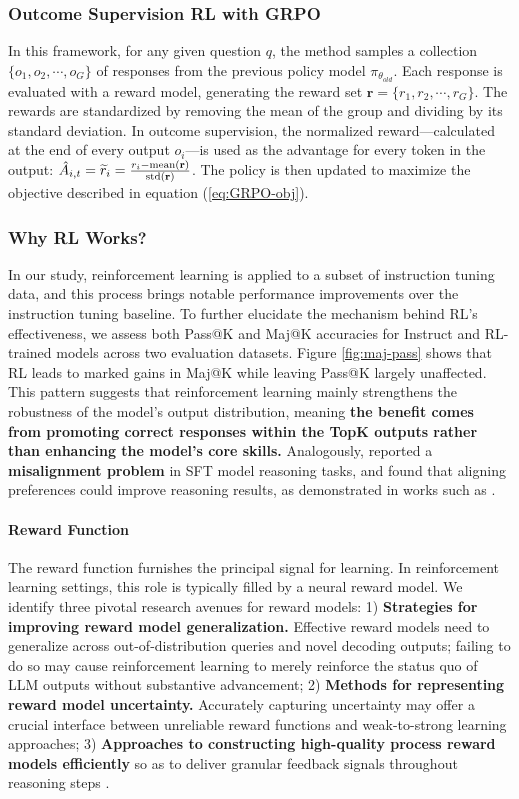 \subsubsection{Outcome Supervision RL with GRPO} In this framework, for any given question $q$, the method samples a collection $\{o_1, o_2, \cdots, o_G\}$ of responses from the previous policy model $\pi_{\theta_{old}}$. Each response is evaluated with a reward model, generating the reward set $\mathbf{r}=\{r_1, r_2, \cdots, r_G\}$. The rewards are standardized by removing the mean of the group and dividing by its standard deviation. In outcome supervision, the normalized reward—calculated at the end of every output $o_i$—is used as the advantage for every token in the output: $\hat{A}_{i, t} = \widetilde{r}_i = \frac{r_i- {\rm mean}(\mathbf{r})}{{\rm std}(\mathbf{r})}$. The policy is then updated to maximize the objective described in equation (\ref{eq:GRPO-obj}).

\subsubsection{Why RL Works?} In our study, reinforcement learning is applied to a subset of instruction tuning data, and this process brings notable performance improvements over the instruction tuning baseline. To further elucidate the mechanism behind RL's effectiveness, we assess both Pass@K and Maj@K accuracies for Instruct and RL-trained models across two evaluation datasets. Figure \ref{fig:maj-pass} shows that RL leads to marked gains in Maj@K while leaving Pass@K largely unaffected. This pattern suggests that reinforcement learning mainly strengthens the robustness of the model’s output distribution, meaning \textbf{the benefit comes from promoting correct responses within the TopK outputs rather than enhancing the model’s core skills.} Analogously, \citep{wang2023making} reported a \textbf{misalignment problem} in SFT model reasoning tasks, and found that aligning preferences could improve reasoning results, as demonstrated in works such as \citep{yuan2023rrhf,song2023preference,wang2023making}.

\paragraph{Reward Function} The reward function furnishes the principal signal for learning. In reinforcement learning settings, this role is typically filled by a neural reward model. We identify three pivotal research avenues for reward models: 1) \textbf{Strategies for improving reward model generalization.} Effective reward models need to generalize across out-of-distribution queries and novel decoding outputs; failing to do so may cause reinforcement learning to merely reinforce the status quo of LLM outputs without substantive advancement; 2) \textbf{Methods for representing reward model uncertainty.} Accurately capturing uncertainty may offer a crucial interface between unreliable reward functions and weak-to-strong learning approaches; 3) \textbf{Approaches to constructing high-quality process reward models efficiently} so as to deliver granular feedback signals throughout reasoning steps \citep{lightman2023let,wang2023math}.

